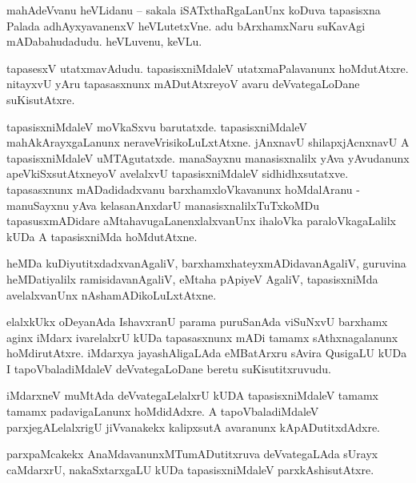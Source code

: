 \documentclass{article}
\begin{document}
\begin{mn}%
mahAdeVvanu heVLidanu -- sakala iSATxthaRgaLanUnx koDuva tapasisxna Palada adhAyxyavanenxV 
heVLutetxVne. adu bArxhamxNaru suKavAgi mADabahudadudu. heVLuvenu, keVLu.
\end{mn}

\begin{mn}%
tapasesxV utatxmavAdudu. tapasisxniMdaleV utatxmaPalavanunx hoMdutAtxre. nitayxvU yAru tapasasxnunx 
mADutAtxreyoV avaru deVvategaLoDane suKisutAtxre.
\end{mn}

\begin{mn}%
tapasisxniMdaleV moVkaSxvu barutatxde. tapasisxniMdaleV mahAkArayxgaLanunx neraveVrisikoLuLxtAtxne. 
jAnxnavU shilapxjAcnxnavU A tapasisxniMdaleV uMTAgutatxde. manaSayxnu manasisxnalilx yAva yAvudanunx
apeVkiSxsutAtxneyoV avelalxvU tapasisxniMdaleV sidhidhxsutatxve. tapasasxnunx mADadidadxvanu 
barxhamxloVkavanunx hoMdalAranu - manuSayxnu yAva kelasanAnxdarU manasisxnalilxTuTxkoMDu 
tapasusxmADidare aMtahavugaLanenxlalxvanUnx ihaloVka paraloVkagaLalilx kUDa A tapasisxniMda 
hoMdutAtxne.
\end{mn}

\begin{mn}%
heMDa kuDiyutitxdadxvanAgaliV, barxhamxhateyxmADidavanAgaliV, guruvina heMDatiyalilx 
ramisidavanAgaliV, eMtaha pApiyeV AgaliV, tapasisxniMda avelalxvanUnx nAshamADikoLuLxtAtxne.
\end{mn}

\begin{mn}%
elalxkUkx oDeyanAda IshavxranU parama puruSanAda viSuNxvU barxhamx aginx iMdarx ivarelalxrU kUDa 
tapasasxnunx mADi tamamx sAthxnagalanunx hoMdirutAtxre. iMdarxya jayashAligaLAda 
eMBatArxru sAvira QusigaLU kUDa I tapoVbaladiMdaleV deVvategaLoDane beretu suKisutitxruvudu.
\end{mn}

\begin{mn}%
iMdarxneV muMtAda deVvategaLelalxrU kUDA tapasisxniMdaleV tamamx tamamx padavigaLanunx hoMdidAdxre. 
A tapoVbaladiMdaleV parxjegALelalxrigU jiVvanakekx kalipxsutA avaranunx kApADutitxdAdxre.
\end{mn}

\begin{mn}%
parxpaMcakekx AnaMdavanunxMTumADutitxruva deVvategaLAda sUrayx caMdarxrU, nakaSxtarxgaLU kUDa 
tapasisxniMdaleV parxkAshisutAtxre.
\end{mn}
\end{document}
